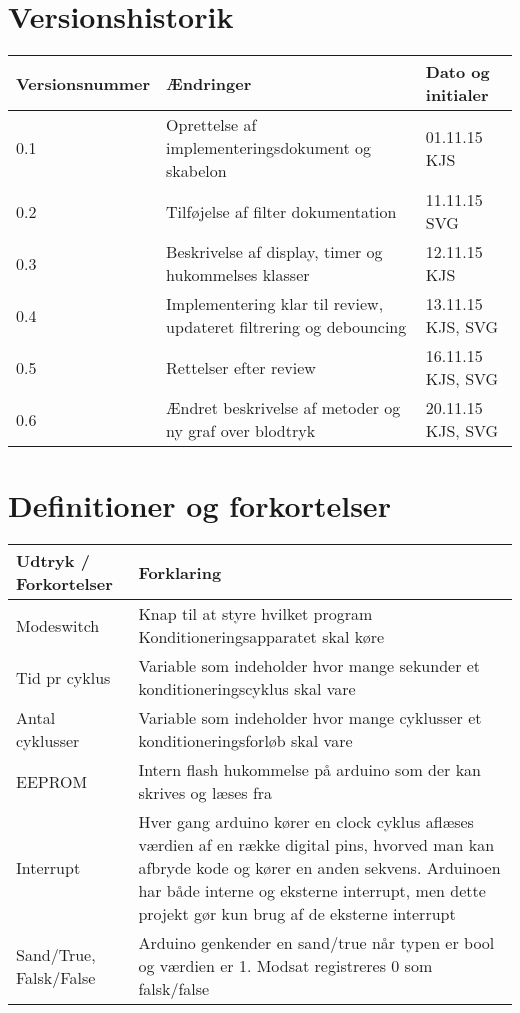 	\newpage
	\section{Versionshistorik}
	\begin{longtable}{ |p{} |p{}| p{}|  } 
		\hline
		\rowcolor{usDef}
		\textbf{Versionsnummer} &  \textbf{Ændringer} & \textbf{Dato og initialer} \\
		\hline
		0.1 & Oprettelse af implementeringsdokument og skabelon & 01.11.15 KJS \\
		\hline
		0.2 & Tilføjelse af filter dokumentation & 11.11.15 SVG \\
		\hline
		0.3 & Beskrivelse af display, timer og hukommelses klasser & 12.11.15 KJS \\
		\hline
		0.4 &  Implementering klar til review, updateret filtrering og debouncing & 13.11.15 KJS, SVG \\
		\hline
		0.5 &  Rettelser efter review & 16.11.15 KJS, SVG \\
		\hline
		0.6 &  Ændret beskrivelse af metoder og ny graf over blodtryk & 20.11.15 KJS, SVG \\
		\hline
	\end{longtable}
	
	\section{Definitioner og forkortelser}
	\begin{longtable}{ |p{} |p{}| } 
		\hline
		\rowcolor{usDef}
		\textbf{Udtryk / Forkortelser} &  \textbf{Forklaring} \\
		\hline
		Modeswitch & Knap til at styre hvilket program Konditioneringsapparatet skal køre \\
		\hline
		Tid pr cyklus & Variable som indeholder hvor mange sekunder et konditioneringscyklus skal vare \\
		\hline
		Antal cyklusser & Variable som indeholder hvor mange cyklusser et konditioneringsforløb skal vare \\
		\hline
		EEPROM & Intern flash hukommelse på arduino som der kan skrives og læses fra \\
		\hline
		Interrupt & Hver gang arduino kører en clock cyklus aflæses værdien af en række digital pins, hvorved man kan afbryde kode og kører en anden sekvens. Arduinoen har både interne og eksterne interrupt, men dette projekt gør kun brug af de eksterne interrupt \\
		\hline
		Sand/True, Falsk/False & Arduino genkender en sand/true når typen er bool og værdien er 1. Modsat registreres 0 som falsk/false \\
		\hline
	\end{longtable}